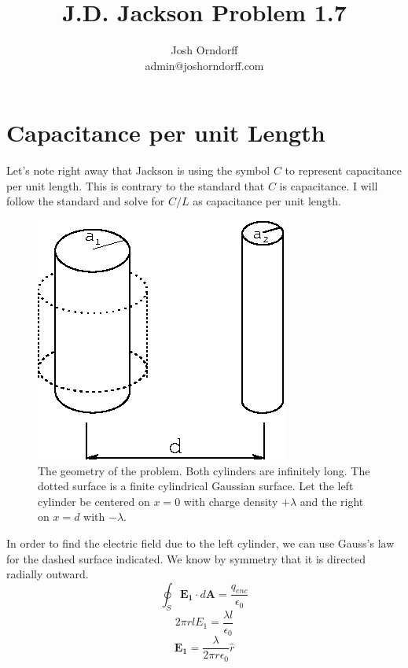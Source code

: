 \documentclass[10pt,a4paper]{article}
\begin{document}
\title{J.D. Jackson Problem 1.7}
\author{Josh Orndorff \\ admin@joshorndorff.com}
\maketitle

\section{Capacitance per unit Length}
Let's note right away that Jackson is using the symbol $C$ to represent capacitance per unit length. This is contrary to the standard that $C$ is capacitance. I will follow the standard and solve for $C/L$ as capacitance per unit length.
\begin{figure}[h]
\centering
\includegraphics[scale=.9]{Jackson1-7.png}
\caption{The geometry of the problem. Both cylinders are infinitely long. The dotted surface is a finite cylindrical Gaussian surface. Let the left cylinder be centered on $x=0$ with charge density $+\lambda$ and the right on $x=d$ with $-\lambda$.}
\end{figure}

In order to find the electric field due to the left cylinder, we can use Gauss's law for the dashed surface indicated. We know by symmetry that it is directed radially outward.
\begin{equation}
\oint_S \mathbf{E_1}\cdot d\mathbf{A} = \frac{q_{enc}}{\epsilon_0}
\end{equation}
\begin{equation}
2\pi r l E_1= \frac{\lambda l}{\epsilon_0}
\end{equation}
\begin{equation}
\mathbf{E_1}= \frac{\lambda}{2\pi r \epsilon_0}\hat{r}
\end{equation}
\end{document}
